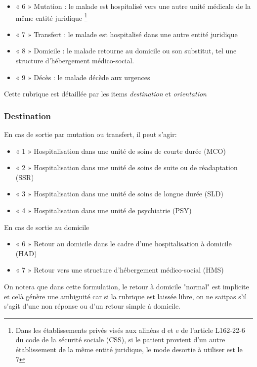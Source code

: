 \documentclass[12pt,english,french,twoside]{report}\usepackage[]{graphicx}\usepackage[]{color}
\begin{document}
\begin{itemize}
  \item « 6 » Mutation : le malade est hospitalisé vers une autre unité médicale de la même
entité juridique \footnote{Dans les établissements privés visés aux alinéas d et e de l'article L162-22-6 du code de la sécurité sociale (CSS), si le patient provient d’un autre établissement de la même entité juridique, le mode desortie à utiliser est le 7}
  \item « 7 » Transfert : le malade est hospitalisé dans une autre entité juridique
  \item « 8 » Domicile : le malade retourne au domicile ou son substitut, tel une
structure d'hébergement médico-social.
  \item « 9 » Décès : le malade décède aux urgences
\end{itemize}

Cette rubrique est détaillée par les items \emph{destination} et \emph{orientation}

\subsubsection{Destination}

En cas de sortie par mutation ou transfert, il peut s'agir:
\begin{itemize}
  \item « 1 » Hospitalisation dans une unité de soins de courte durée (MCO)
  \item « 2 » Hospitalisation dans une unité de soins de suite ou de réadaptation (SSR)
  \item « 3 » Hospitalisation dans une unité de soins de longue durée (SLD)
  \item « 4 » Hospitalisation dans une unité de psychiatrie (PSY)
\end{itemize}

En cas de sortie au domicile
\begin{itemize}
  \item « 6 » Retour au domicile dans le cadre d’une hospitalisation à domicile (HAD)
  \item « 7 » Retour vers une structure d'hébergement médico-social (HMS)
\end{itemize}

On notera que dans cette formulation, le retour à domicile "normal" est implicite et celà génère une ambiguité car si la rubrique est laissée libre, on ne saitpas s'il s'agit d'une non réponse ou d'un retour simple à domicile.
\end{document}

